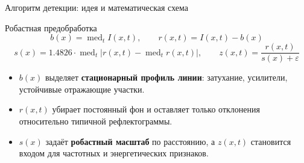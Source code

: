 \documentclass[aspectratio=169,11pt]{beamer}
\begin{document}
\begin{frame}[t]{Алгоритм детекции: идея и математическая схема}
    \begin{center}
    \end{center}

    \vspace{0.2ex}
    \begin{block}{Робастная предобработка}
        \small
        \[
            b(x)=\operatorname{med}_t I(x,t), \qquad
            r(x,t)=I(x,t)-b(x)
        \]
        \[
            s(x)=1.4826 \cdot \operatorname{med}_t \left| r(x,t)-\operatorname{med}_t r(x,t)\right|, \qquad
            z(x,t)=\frac{r(x,t)}{s(x)+\varepsilon}
        \]
    \end{block}

    \small
    \begin{itemize}
        \item $b(x)$ выделяет \textbf{стационарный профиль линии}: затухание, усилители, устойчивые отражающие участки.
        \item $r(x,t)$ убирает постоянный фон и оставляет только отклонения относительно типичной рефлектограммы.
        \item $s(x)$ задаёт \textbf{робастный масштаб} по расстоянию, а $z(x,t)$ становится входом для частотных и энергетических признаков.
    \end{itemize}
\end{frame}
\end{document}
